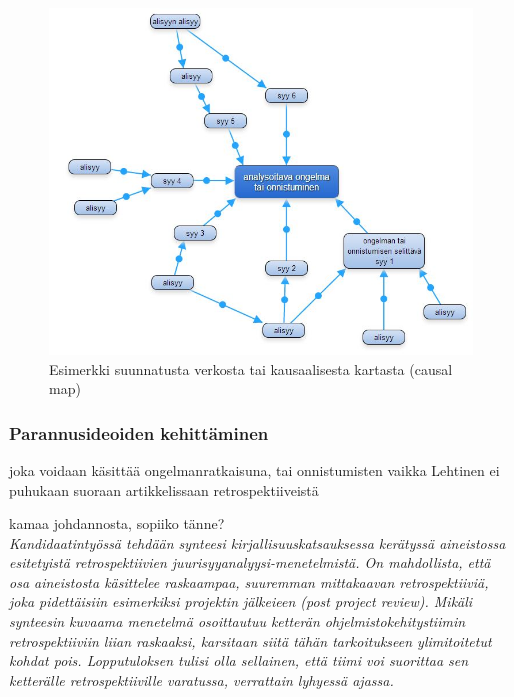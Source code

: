 \begin{figure}[ht!]
\centering
\includegraphics[width=150mm]{suunnattu_verkko_esimerkki_relaatioilla.jpg}
\caption{Esimerkki suunnatusta verkosta tai kausaalisesta kartasta (causal map)}
\label{verkko_ex}
\end{figure}


\subsubsection{Parannusideoiden kehittäminen}





joka voidaan käsittää ongelmanratkaisuna, tai onnistumisten 
 vaikka Lehtinen ei puhukaan suoraan artikkelissaan retrospektiiveistä



kamaa johdannosta, sopiiko tänne?\\
\textit{Kandidaatintyössä tehdään synteesi kirjallisuuskatsauksessa kerätyssä aineistossa esitetyistä retrospektiivien juurisyyanalyysi-menetelmistä. On mahdollista, että osa aineistosta käsittelee raskaampaa, suuremman mittakaavan retrospektiiviä, joka pidettäisiin esimerkiksi projektin jälkeieen (post project review). Mikäli synteesin kuvaama menetelmä osoittautuu ketterän ohjelmistokehitystiimin retrospektiiviin liian raskaaksi, karsitaan siitä tähän tarkoitukseen ylimitoitetut kohdat pois. Lopputuloksen tulisi olla sellainen, että tiimi voi suorittaa sen ketterälle retrospektiiville varatussa, verrattain lyhyessä ajassa.}




